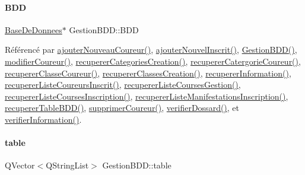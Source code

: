 \paragraph{\texorpdfstring{B\+DD}{BDD}}
{\footnotesize\ttfamily \hyperlink{class_base_de_donnees}{Base\+De\+Donnees}$\ast$ Gestion\+B\+D\+D\+::\+B\+DD\hspace{0.3cm}{\ttfamily [private]}}



Référencé par \hyperlink{class_gestion_b_d_d_ae71561eea6d1163ff067f079ccc6d169}{ajouter\+Nouveau\+Coureur()}, \hyperlink{class_gestion_b_d_d_a71391d5419969b52cd999463b5326599}{ajouter\+Nouvel\+Inscrit()}, \hyperlink{class_gestion_b_d_d_a406bdb9b1714b204fa6fab015baffc27}{Gestion\+B\+D\+D()}, \hyperlink{class_gestion_b_d_d_afad096d7e405d35a818d4858ee34df61}{modifier\+Coureur()}, \hyperlink{class_gestion_b_d_d_a76ab3e307ad9005dcdb2781fc77fc5c8}{recuperer\+Categories\+Creation()}, \hyperlink{class_gestion_b_d_d_ad7b0117ad5d55f21e6f00858038f4a85}{recuperer\+Catergorie\+Coureur()}, \hyperlink{class_gestion_b_d_d_a0e90b16b2e330de9cc80f72f0d648e5d}{recuperer\+Classe\+Coureur()}, \hyperlink{class_gestion_b_d_d_a38d728d644f23048f1a6d3e6d4656764}{recuperer\+Classes\+Creation()}, \hyperlink{class_gestion_b_d_d_a0a2fa02b90974684658937fbfb55bf0a}{recuperer\+Information()}, \hyperlink{class_gestion_b_d_d_a09b547cb065256acd269c64e273c93fd}{recuperer\+Liste\+Coureurs\+Inscrit()}, \hyperlink{class_gestion_b_d_d_ac35de40fd5860b3130f71788ecaa5ef3}{recuperer\+Liste\+Courses\+Gestion()}, \hyperlink{class_gestion_b_d_d_a59ef29e28993c64aa4d5a8c42a8fb08d}{recuperer\+Liste\+Courses\+Inscription()}, \hyperlink{class_gestion_b_d_d_a6c1ab5e51fbd6c92bb096badbeac0df5}{recuperer\+Liste\+Manifestations\+Inscription()}, \hyperlink{class_gestion_b_d_d_a2b44ebc5bf5b1a7babde6512817a85b4}{recuperer\+Table\+B\+D\+D()}, \hyperlink{class_gestion_b_d_d_afe47ec92274b7998131c5d4e6551d177}{supprimer\+Coureur()}, \hyperlink{class_gestion_b_d_d_a1a39bbc7bfcb60d286363b9d2dd7f88b}{verifier\+Dossard()}, et \hyperlink{class_gestion_b_d_d_abfd3cfb9553a83aafd86c3149869d6c0}{verifier\+Information()}.

\mbox{\label{class_gestion_b_d_d_afa3e974fb5afa7f25f275a662e182960}} 
\paragraph{\texorpdfstring{table}{table}}
{\footnotesize\ttfamily Q\+Vector$<$Q\+String\+List$>$ Gestion\+B\+D\+D\+::table\hspace{0.3cm}{\ttfamily [private]}}



